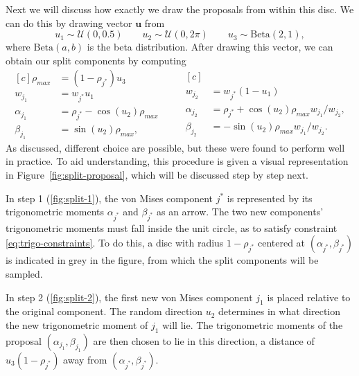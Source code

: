 Next we will discuss how exactly we draw the proposals from  within this disc. We can do this by drawing vector $\bm u$ from
\begin{equation}
u_1 \sim \mathcal{U}(0, 0.5) \qquad u_2 \sim \mathcal{U}(0, 2\pi) \qquad u_3 \sim \text{Beta}(2, 1),
\end{equation}
where $\text{Beta}(a, b)$ is the beta distribution. After drawing this vector, we can obtain our split components by computing
\begin{equation}
\label{eq:split-proposal}
\begin{aligned}[c]
\rho_{max} &= (1-\rho_{j^*}) u_3 \\
w_{j_1} &= w_{j^*} u_1 \\
\alpha_{j_1} &= \rho_{j^*} - \cos(u_2) \rho_{max} \\
\beta_{j_1} &= \sin(u_2) \rho_{max},
\end{aligned}
\qquad
\begin{aligned}[c]
\\
w_{j_2} &= w_{j^*} (1-u_1) \\
\alpha_{j_2} &= \rho_{j^*} + \cos(u_2) \rho_{max} w_{j_1} / w_{j_2}, \\
\beta_{j_2} &= -\sin(u_2) \rho_{max} w_{j_1} / w_{j_2}.
\end{aligned}
\end{equation}
As discussed, different choice are possible, but these were found to perform well in practice. To aid understanding, this procedure is given a visual representation in Figure~\ref{fig:split-proposal}, which will be discussed step by step next.

In step 1 (\ref{fig:split-1}), the  von Mises component $j^*$ is represented by its trigonometric moments $\alpha_{j^*}$ and $\beta_{j^*}$ as an arrow. The two new components' trigonometric moments must fall inside the unit circle, as to satisfy constraint \eqref{eq:trigo-constraints}. To do this, a disc with radius $1 - \rho_{j^*}$ centered at $(\alpha_{j^*}, \beta_{j^*})$ is indicated in grey in the figure, from which the split components will be sampled. %

In step 2 (\ref{fig:split-2}), the first new von Mises component $j_1$ is placed relative to the original component. The random direction $u_2$ determines in what direction the new trigonometric moment of $j_1$ will lie. The trigonometric moments of the proposal $(\alpha_{j_1}, \beta_{j_1})$ are then chosen to lie in this direction, a distance of $u_3 (1 - \rho_{j^*})$ away from $(\alpha_{j^*}, \beta_{j^*})$. 

